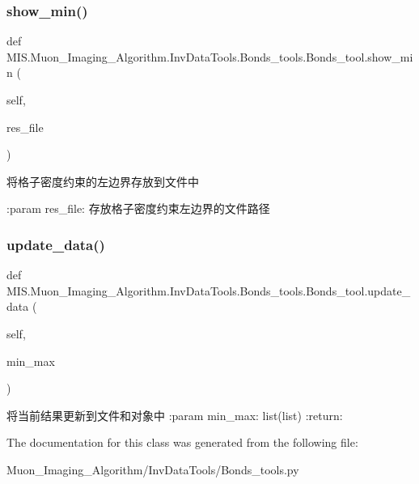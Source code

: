 \subsubsection{\texorpdfstring{show\+\_\+min()}{show\_min()}}
{\footnotesize\ttfamily def M\+I\+S.\+Muon\+\_\+\+Imaging\+\_\+\+Algorithm.\+Inv\+Data\+Tools.\+Bonds\+\_\+tools.\+Bonds\+\_\+tool.\+show\+\_\+min (\begin{DoxyParamCaption}\item[{}]{self,  }\item[{}]{res\+\_\+file }\end{DoxyParamCaption})}

\begin{DoxyVerb}将格子密度约束的左边界存放到文件中

:param res_file: 存放格子密度约束左边界的文件路径
\end{DoxyVerb}
 \mbox{\label{classMIS_1_1Muon__Imaging__Algorithm_1_1InvDataTools_1_1Bonds__tools_1_1Bonds__tool_ada1e06c4bdf1524803599a9bd3f96e14}} 
\subsubsection{\texorpdfstring{update\+\_\+data()}{update\_data()}}
{\footnotesize\ttfamily def M\+I\+S.\+Muon\+\_\+\+Imaging\+\_\+\+Algorithm.\+Inv\+Data\+Tools.\+Bonds\+\_\+tools.\+Bonds\+\_\+tool.\+update\+\_\+data (\begin{DoxyParamCaption}\item[{}]{self,  }\item[{}]{min\+\_\+max }\end{DoxyParamCaption})}

\begin{DoxyVerb}将当前结果更新到文件和对象中
:param min_max: list(list)
:return:
\end{DoxyVerb}
 

The documentation for this class was generated from the following file\+:\begin{DoxyCompactItemize}
\item 
Muon\+\_\+\+Imaging\+\_\+\+Algorithm/\+Inv\+Data\+Tools/Bonds\+\_\+tools.\+py\end{DoxyCompactItemize}
